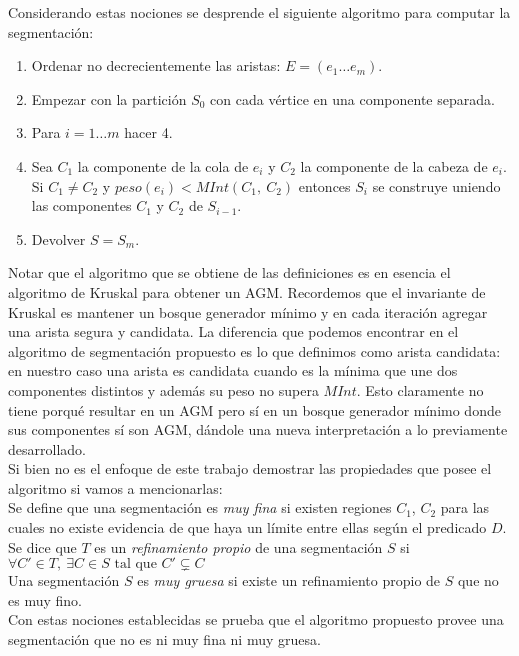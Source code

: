 \indent Considerando estas nociones se desprende el siguiente algoritmo para computar la segmentaci\'on:
\begin{enumerate}
	\item Ordenar no decrecientemente las aristas: $E=(e_1 \dots e_m)$.
	\item Empezar con la partici\'on $S_0$ con cada vértice en una componente separada.
	\item Para $i=1\dots m$ hacer 4.
	\item Sea $C_1$ la componente de la cola de $e_i$ y $C_2$ la componente de la cabeza de $e_i$. Si $C_1\neq C_2$ y $peso(e_i) < MInt(C_1,\ C_2)$ entonces $S_i$ se construye uniendo las componentes $C_1$ y $C_2$ de $S_{i-1}$.
	\item Devolver $S=S_m$.
\end{enumerate}

Notar que el algoritmo que se obtiene de las definiciones es en esencia el algoritmo de Kruskal para obtener un AGM. Recordemos que el invariante de Kruskal es mantener un bosque generador m\'inimo y en cada iteraci\'on agregar una arista segura y candidata. La diferencia que podemos encontrar en el algoritmo de segmentaci\'on propuesto es lo que definimos como arista candidata: en nuestro caso una arista es candidata cuando es la m\'inima que une dos componentes distintos y además su peso no supera $MInt$. Esto claramente no tiene porqué resultar en un AGM pero sí en un bosque generador m\'inimo donde sus componentes s\'i son AGM, dándole una nueva interpretaci\'on a lo previamente desarrollado. \\
\indent Si bien no es el enfoque de este trabajo demostrar las propiedades que posee el algoritmo si vamos a mencionarlas:\\
Se define que una segmentaci\'on es \textit{muy fina} si existen regiones $C_1$, $C_2$ para las cuales no existe evidencia de que haya un l\'imite entre ellas seg\'un el predicado $D$. \\
\indent Se dice que $T$ es un \textit{refinamiento propio} de una segmentaci\'on $S$ si $\forall C'\in T, \ \exists C\in S \text{ tal que } C'\subsetneq C$ \\
\indent Una segmentaci\'on $S$ es \textit{muy gruesa} si existe un refinamiento propio de $S$ que no es muy fino.\\
\indent Con estas nociones establecidas se prueba que el algoritmo propuesto provee una segmentaci\'on que no es ni muy fina ni muy gruesa.